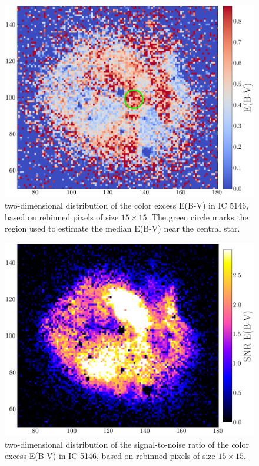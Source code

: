 \documentclass[fleqn,usenatbib]{mnras}
\begin{document}
\begin{figure}\centering
	\includegraphics[width=0.94\columnwidth]{EBV_image.png}
    \caption{two-dimensional distribution of the color excess E(B-V) in IC 5146, based on rebinned pixels of size $15 \times 15$. 
    The green circle marks the region used to estimate the median E(B-V) near the central star.}
    \label{fig:EBV_image}
\end{figure}

\begin{figure}\centering
	\includegraphics[width=0.94\columnwidth]{SNR_EBV_image.png}
    \caption{two-dimensional distribution of the signal-to-noise ratio of the color excess E(B-V) in IC 5146, based on rebinned pixels of size $15 \times 15$. }
    \label{fig:SNR_EBV_image}
\end{figure}
\end{document}
